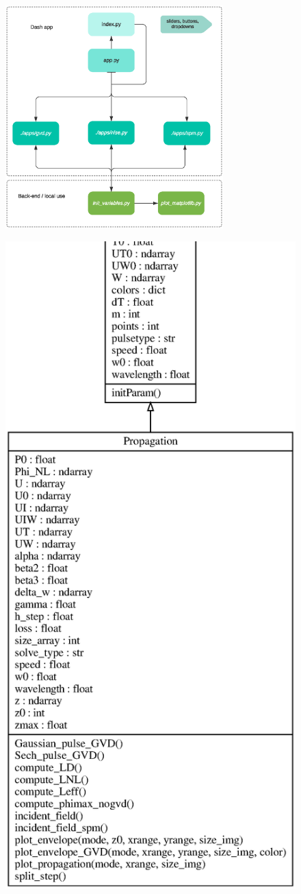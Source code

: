     \begin{figure}[label={fig:appdash}, caption={Global structure of the code.}]
        	\includegraphics[trim = 0cm 0.5cm 0 1.2cm, clip, width=0.75\textwidth]{figures/chap3/Apps.eps} 
        \end{figure}
    \begin{figure}[label={fig:UML}, caption={Class Diagram of init\_variables.py}]
        	\includegraphics[width=.6\textwidth]{figures/chap3/init_variables.eps} 
        \end{figure}
    
